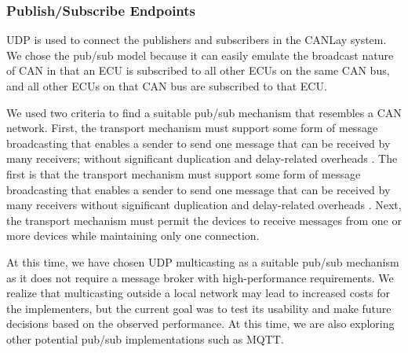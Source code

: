 \documentclass[letterpaper,twocolumn,12pt]{article}
\begin{document}
\subsubsection{Publish/Subscribe Endpoints}
UDP is used to connect the publishers and subscribers in the CANLay system. 
We chose the pub/sub model because it can easily emulate the broadcast nature of CAN \cite{kaiser_implementing_1999} in that an ECU is subscribed to all other ECUs on the same CAN bus, and all other ECUs on that CAN bus are subscribed to that ECU. 

We used two criteria to find a suitable pub/sub mechanism that resembles a CAN network. 
First, the transport mechanism must support some form of message broadcasting that enables a sender to send one message that can be received by many receivers; without significant duplication and delay-related overheads \cite{kaiser_implementing_1999}. 
The first is that the transport mechanism must support some form of message broadcasting that enables a sender to send one message that can be received by many receivers without significant duplication and delay-related overheads \cite{kaiser_implementing_1999}. 
Next, the transport mechanism must permit the devices to receive messages from one or more devices while maintaining only one connection.

At this time, we have chosen UDP multicasting as a suitable pub/sub mechanism as it does not require a message broker with high-performance requirements. We realize that multicasting outside a local network may lead to increased costs for the implementers, but the current goal was to test its usability and make future decisions based on the observed performance. At this time, we are also exploring other potential pub/sub implementations such as MQTT.
\end{document}
